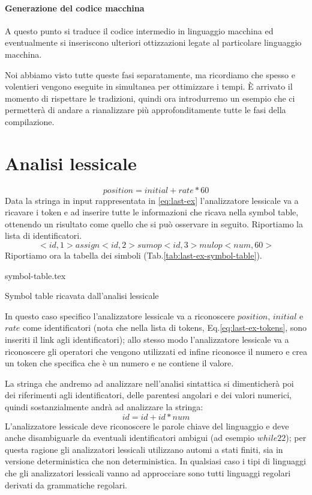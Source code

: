 \documentclass[class=book, crop=false, oneside, 12pt]{standalone}
\begin{document}
\paragraph{Generazione del codice macchina}	A questo punto si traduce il codice intermedio in linguaggio macchina ed eventualmente si inseriscono ulteriori ottizzazioni legate al particolare linguaggio macchina.
    
Noi abbiamo visto tutte queste fasi separatamente, ma ricordiamo che spesso e volentieri vengono eseguite in simultanea per ottimizzare i tempi.
È arrivato il momento di rispettare le tradizioni, quindi ora introdurremo un esempio che ci permetterà di andare a rianalizzare più approfonditamente tutte le fasi della compilazione.
\section{Analisi lessicale}
\begin{equation}
    \label{eq:last-ex}
    position = initial + rate * 60
\end{equation}
Data la stringa in input rappresentata in \ref{eq:last-ex} l'analizzatore lessicale va a ricavare i token e ad inserire tutte le informazioni che ricava nella symbol table, ottenendo un risultato come quello che si può osservare in seguito.
Riportiamo la lista di identificatori.
\begin{equation}
    \label{eq:last-ex-tokens}
    <id,1> assign <id,2> sumop <id, 3> mulop <num, 60>
\end{equation}
Riportiamo ora la tabella dei simboli (Tab.\ref{tab:last-ex-symbol-table}).
\begin{table}[H]
	\centering
	{symbol-table.tex}
    \caption{Symbol table ricavata dall'analisi lessicale}
    \label{tab:last-ex-symbol-table}
\end{table} 

In questo caso specifico l'analizzatore lessicale va a riconoscere \(position\), \(initial\) e \(rate\) come identificatori (nota che nella lista di tokens, Eq.\ref{eq:last-ex-tokens}, sono inseriti il link agli identificatori); allo stesso modo l'analizzatore lessicale va a riconoscere gli operatori che vengono utilizzati ed infine riconosce il numero e crea un token che specifica che è un numero e ne contiene il valore.

La stringa che andremo ad analizzare nell'analisi sintattica si dimenticherà poi dei riferimenti agli identificatori, delle parentesi angolari e dei valori numerici, quindi sostanzialmente andrà ad analizzare la stringa:
\begin{equation}
    id = id + id * num
\end{equation}
L'analizzatore lessicale deve riconoscere le parole chiave del linguaggio e deve anche disambiguarle da eventuali identificatori ambigui (ad esempio \(while22\)); per questa ragione gli analizzatori lessicali utilizzano automi a stati finiti, sia in versione deterministica che non deterministica.
In qualsiasi caso i tipi di linguaggi che gli analizzatori lessicali vanno ad approcciare sono tutti linguaggi regolari derivati da grammatiche regolari.
\end{document}
